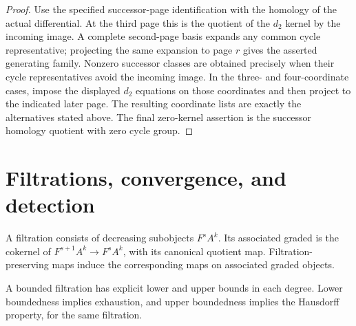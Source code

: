 \begin{proof}
Use the specified successor-page identification with the homology of the
actual differential. At the third page this is the quotient of the
$d_2$ kernel by the incoming image. A complete second-page basis expands
any common cycle representative; projecting the same expansion to page
$r$ gives the asserted generating family. Nonzero successor classes are
obtained precisely when their cycle representatives avoid the incoming
image. In the three- and four-coordinate cases, impose the displayed
$d_2$ equations on those coordinates and then project to the indicated
later page. The resulting coordinate lists are exactly the alternatives
stated above. The final zero-kernel assertion is the successor homology
quotient with zero cycle group.
\end{proof}


\section{Filtrations, convergence, and detection}

\begin{definition}
\label{sem:SpectralSequence:filtration}
A filtration consists of decreasing subobjects $F^s A^k$. Its associated graded is the cokernel of $F^{s+1}A^k\longrightarrow F^sA^k$, with its canonical quotient map. Filtration-preserving maps induce the corresponding maps on associated graded objects.

A bounded filtration has explicit lower and upper bounds in each degree. Lower boundedness implies exhaustion, and upper boundedness implies the Hausdorff property, for the same filtration.
\end{definition}


